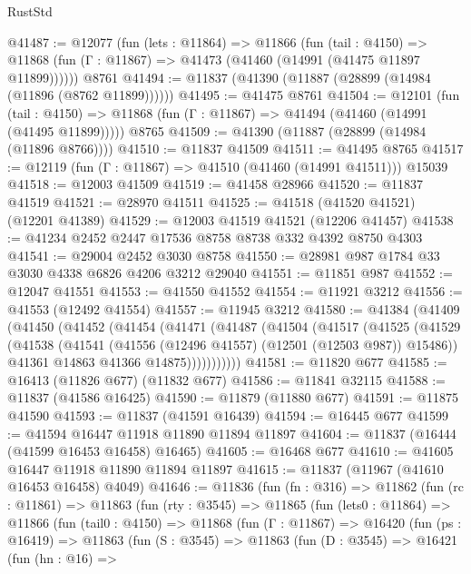 \begin{lexlean}{RustStd}
\begin{coremodule}
@41487 := @12077
    (fun (lets : @11864) =>
    @11866
      (fun (tail : @4150) =>
      @11868 (fun (Γ : @11867) => @41473 (@41460 (@14991 (@41475 @11897 @11899))))))
    @8761
@41494 := @11837 (@41390 (@11887 (@28899 (@14984 (@11896 (@8762 @11899))))))
@41495 := @41475 @8761
@41504 := @12101
    (fun (tail : @4150) => @11868 (fun (Γ : @11867) => @41494 (@41460 (@14991 (@41495 @11899)))))
    @8765
@41509 := @41390 (@11887 (@28899 (@14984 (@11896 @8766))))
@41510 := @11837 @41509
@41511 := @41495 @8765
@41517 := @12119 (fun (Γ : @11867) => @41510 (@41460 (@14991 @41511))) @15039
@41518 := @12003 @41509
@41519 := @41458 @28966
@41520 := @11837 @41519
@41521 := @28970 @41511
@41525 := @41518 (@41520 @41521) (@12201 @41389)
@41529 := @12003 @41519 @41521 (@12206 @41457)
@41538 := @41234 @2452 @2447 @17536 @8758 @8738 @332 @4392 @8750 @4303
@41541 := @29004 @2452 @3030 @8758
@41550 := @28981 @987 @1784 @33 @3030 @4338 @6826 @4206 @3212 @29040
@41551 := @11851 @987
@41552 := @12047 @41551
@41553 := @41550 @41552
@41554 := @11921 @3212
@41556 := @41553 (@12492 @41554)
@41557 := @11945 @3212
@41580 := @41384
    (@41409
      (@41450
        (@41452
          (@41454
            (@41471
              (@41487
                (@41504
                  (@41517
                    (@41525
                      (@41529
                        (@41538
                          (@41541 (@41556 (@12496 @41557) (@12501 (@12503 @987)) @15486))
                          @41361
                          @14863
                          @41366
                          @14875)))))))))))
@41581 := @11820 @677
@41585 := @16413 (@11826 @677) (@11832 @677)
@41586 := @11841 @32115
@41588 := @11837 (@41586 @16425)
@41590 := @11879 (@11880 @677)
@41591 := @11875 @41590
@41593 := @11837 (@41591 @16439)
@41594 := @16445 @677
@41599 := @41594 @16447 @11918 @11890 @11894 @11897
@41604 := @11837 (@16444 (@41599 @16453 @16458) @16465)
@41605 := @16468 @677
@41610 := @41605 @16447 @11918 @11890 @11894 @11897
@41615 := @11837 (@11967 (@41610 @16453 @16458) @4049)
@41646 := @11836
    (fun (fn : @316) =>
    @11862
      (fun (rc : @11861) =>
      @11863
        (fun (rty : @3545) =>
        @11865
          (fun (lets0 : @11864) =>
          @11866
            (fun (tail0 : @4150) =>
            @11868
              (fun (Γ : @11867) =>
              @16420
                (fun (ps : @16419) =>
                @11863
                  (fun (S : @3545) =>
                  @11863
                    (fun (D : @3545) =>
                    @16421
                      (fun (hn : @16) =>

\end{coremodule}
\end{lexlean}
